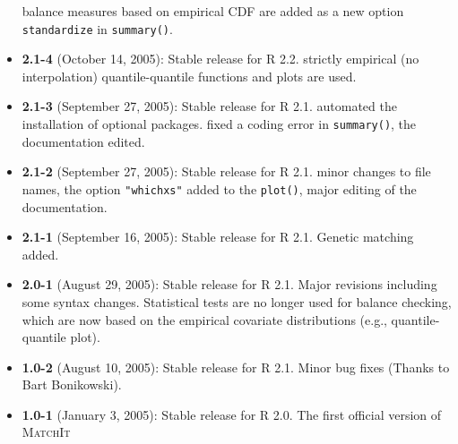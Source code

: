 \documentclass[oneside,letterpaper,12pt]{book}
\newcommand{\MatchIt}{\textsc{MatchIt}}
\begin{document}
\begin{itemize}
  balance measures based on empirical CDF are added as a new option
  {\tt standardize} in {\tt summary()}.
\item \textbf{2.1-4} (October 14, 2005): Stable release for R 2.2.
  strictly empirical (no interpolation) quantile-quantile functions
  and plots are used.
\item \textbf{2.1-3} (September 27, 2005): Stable release for R 2.1.
  automated the installation of optional packages. fixed a coding
  error in {\tt summary()}, the documentation edited.
\item \textbf{2.1-2} (September 27, 2005): Stable release for R 2.1.
  minor changes to file names, the option {\tt "whichxs"} added to the
  {\tt plot()}, major editing of the documentation.
\item \textbf{2.1-1} (September 16, 2005): Stable release for R
        2.1. Genetic matching added.    
\item \textbf{2.0-1} (August 29, 2005): Stable release for R 2.1.
  Major revisions including some syntax changes. Statistical tests are
  no longer used for balance checking, which are now based on the
  empirical covariate distributions (e.g., quantile-quantile plot).
\item \textbf{1.0-2} (August 10, 2005): Stable release for R
  2.1. Minor bug fixes (Thanks to Bart Bonikowski).
\item \textbf{1.0-1} (January 3, 2005): Stable release for R 2.0. The
  first official version of \MatchIt
\end{itemize}



\clearpage



\end{document}
